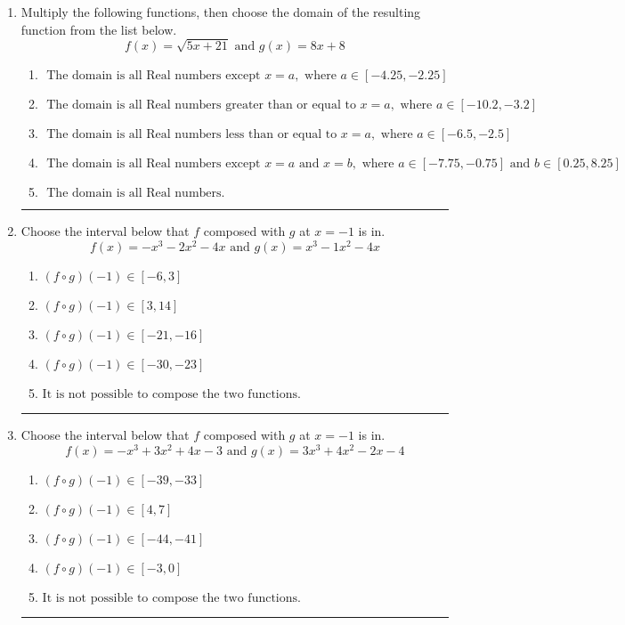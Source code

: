 \documentclass[14pt]{extbook}
\newcommand{\litem}[1]{\item#1\hspace*{-1cm}\rule{\textwidth}{0.4pt}}
\begin{document}
\begin{enumerate}
{\begin{enumerate}[label=\Alph*.]
\end{enumerate} }
\litem{
Multiply the following functions, then choose the domain of the resulting function from the list below.\[ f(x) = \sqrt{5x+21}  \text{ and } g(x) = 8x + 8 \]\begin{enumerate}[label=\Alph*.]
\item \( \text{ The domain is all Real numbers except } x = a, \text{ where } a \in [-4.25, -2.25] \)
\item \( \text{ The domain is all Real numbers greater than or equal to } x = a, \text{ where } a \in [-10.2, -3.2] \)
\item \( \text{ The domain is all Real numbers less than or equal to } x = a, \text{ where } a \in [-6.5, -2.5] \)
\item \( \text{ The domain is all Real numbers except } x = a \text{ and } x = b, \text{ where } a \in [-7.75, -0.75] \text{ and } b \in [0.25, 8.25] \)
\item \( \text{ The domain is all Real numbers. } \)

\end{enumerate} }
\litem{
Choose the interval below that $f$ composed with $g$ at $x=-1$ is in.\[ f(x) = -x^{3} -2 x^{2} -4 x \text{ and } g(x) = x^{3} -1 x^{2} -4 x \]\begin{enumerate}[label=\Alph*.]
\item \( (f \circ g)(-1) \in [-6, 3] \)
\item \( (f \circ g)(-1) \in [3, 14] \)
\item \( (f \circ g)(-1) \in [-21, -16] \)
\item \( (f \circ g)(-1) \in [-30, -23] \)
\item \( \text{It is not possible to compose the two functions.} \)

\end{enumerate} }
\litem{
Choose the interval below that $f$ composed with $g$ at $x=-1$ is in.\[ f(x) = -x^{3} +3 x^{2} +4 x -3 \text{ and } g(x) = 3x^{3} +4 x^{2} -2 x -4 \]\begin{enumerate}[label=\Alph*.]
\item \( (f \circ g)(-1) \in [-39, -33] \)
\item \( (f \circ g)(-1) \in [4, 7] \)
\item \( (f \circ g)(-1) \in [-44, -41] \)
\item \( (f \circ g)(-1) \in [-3, 0] \)
\item \( \text{It is not possible to compose the two functions.} \)


\end{enumerate}}
\end{enumerate}
\end{document}
